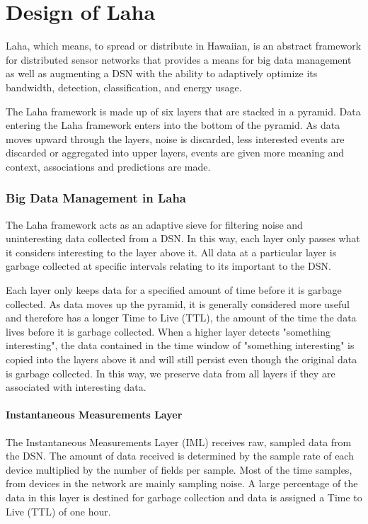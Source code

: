 \chapter{Design of Laha}

Laha, which means, to spread or distribute in Hawaiian, is an abstract framework for distributed sensor networks that provides a means for big data management as well as augmenting a DSN with the ability to adaptively optimize its bandwidth, detection, classification, and energy usage.

The Laha framework is made up of six layers that are stacked in a pyramid. Data entering the Laha framework enters into the bottom of the pyramid. As data moves upward through the layers, noise is discarded, less interested events are discarded or aggregated into upper layers, events are given more meaning and context, associations and predictions are made. 

\subsection{Big Data Management in Laha} \label{big-data-management}
The Laha framework acts as an adaptive sieve for filtering noise and uninteresting data collected from a DSN. In this way, each layer only passes what it considers interesting to the layer above it. All data at a particular layer is garbage collected at specific intervals relating to its important to the DSN.

Each layer only keeps data for a specified amount of time before it is garbage collected. As data moves up the pyramid, it is generally considered more useful and therefore has a longer Time to Live (TTL), the amount of the time the data lives before it is garbage collected.  When a higher layer detects "something interesting", the data contained in the time window of "something interesting" is copied into the layers above it and will still persist even though the original data is garbage collected. In this way, we preserve data from all layers if they are associated with interesting data. 

\subsubsection{Instantaneous Measurements Layer}
The Instantaneous Measurements Layer (IML) receives raw, sampled data from the DSN. The amount of data received is determined by the sample rate of each device multiplied by the number of fields per sample. Most of the time samples, from devices in the network are mainly sampling noise. A large percentage of the data in this layer is destined for garbage collection and data is assigned a Time to Live (TTL) of one hour. 


